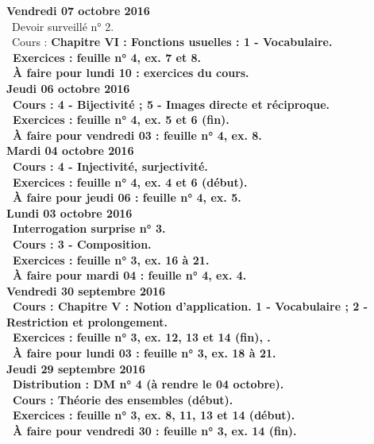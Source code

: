\documentclass[12pt,a4paper]{article}
\begin{document}
\noindent\textbf{Vendredi 07 octobre 2016}\\
\bu\ Devoir surveillé n° 2.\\
\bu\ Cours : \bf Chapitre VI \rm : Fonctions usuelles : 1 - Vocabulaire.\\
\bu\ Exercices : feuille n° 4, ex. 7 et 8.\\
\bu\ À faire pour lundi 10 : exercices du cours.\vspace{.4cm}\\

\noindent\textbf{Jeudi 06 octobre 2016}\\
\bu\ Cours : 4 - Bijectivité ; 5 - Images directe et réciproque.\\
\bu\ Exercices : feuille n° 4, ex. 5 et 6 (fin).\\
\bu\ À faire pour vendredi 03 : feuille n° 4, ex. 8.\vspace{.4cm}\\

\noindent\textbf{\bf Mardi 04 octobre 2016}\\
\bu\ Cours : 4 - Injectivité, surjectivité.\\
\bu\ Exercices : feuille n° 4, ex. 4 et 6 (début).\\
\bu\ À faire pour jeudi 06 : feuille n° 4, ex. 5.\vspace{.4cm}\\

\noindent\textbf{Lundi 03 octobre 2016}\\
\bu\ Interrogation surprise n° 3.\\
\bu\ Cours : 3 - Composition.\\
\bu\ Exercices : feuille n° 3, ex. 16 à 21.\\
\bu\ À faire pour mardi 04 : feuille n° 4, ex. 4.\vspace{.4cm}\\
  
\noindent\textbf{Vendredi 30 septembre 2016}\\
\bu\ Cours : \bf Chapitre V \rm : Notion d'application. 1 - Vocabulaire ; 2 - Restriction et prolongement.\\
\bu\ Exercices : feuille n° 3, ex. 12, 13 et 14 (fin), .\\
\bu\ À faire pour lundi 03 : feuille n° 3, ex. 18 à 21.\vspace{.4cm}\\

\noindent\textbf{Jeudi 29 septembre 2016}\\
\bu\ Distribution : DM n° 4 (à rendre le 04 octobre).\\
\bu\ Cours : Théorie des ensembles (début).\\
\bu\ Exercices : feuille n° 3, ex. 8, 11, 13 et 14 (début).\\
\bu\ À faire pour vendredi 30 : feuille n° 3, ex. 14 (fin).\vspace{.4cm}\\
\end{document}
